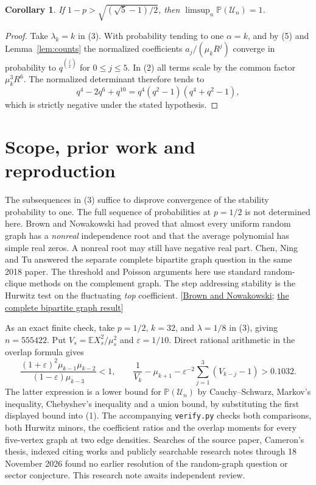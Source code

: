 \documentclass[11pt]{article}
\newtheorem{corollary}[theorem]{Corollary}
\newcommand{\E}{\mathbb E}
\newcommand{\Prob}{\mathbb P}
\newcommand{\Unst}{\mathcal U}
\begin{document}
\begin{corollary}\label{cor:whp}
If $1-p>\sqrt{(\sqrt5-1)/2}$, then $\limsup_n\Prob(\Unst_n)=1$.
\end{corollary}
\begin{proof}
Take $\lambda_k=k$ in (3). With probability tending to one $\alpha=k$,
and by (5) and Lemma~\ref{lem:counts} the normalized coefficients
$a_j/(\mu_k R^j)$ converge in probability to $q^{\binom j2}$ for
$0\le j\le5$. In (2) all terms scale by the common factor
$\mu_k^3 R^6$. The normalized determinant therefore tends to
\[
 q^4-2q^6+q^{10}=q^4(q^2-1)(q^4+q^2-1),
\]
which is strictly negative under the stated hypothesis.
\end{proof}

\section*{Scope, prior work and reproduction}
The subsequences in (3) suffice to disprove convergence of the stability
probability to one. The full sequence of probabilities at $p=1/2$ is
not determined here. Brown and Nowakowski had proved that almost every
uniform random graph has a \emph{nonreal} independence root and that the
average polynomial has simple real zeros. A nonreal root may still have
negative real part. Chen, Ning and Tu answered the separate complete
bipartite graph question in the same 2018 paper. The threshold and
Poisson arguments here use standard random-clique methods on the
complement graph. The step addressing stability is the Hurwitz test on
the fluctuating \emph{top} coefficient.
[\href{https://doi.org/10.1016/j.jctb.2004.10.001}{Brown and Nowakowski};
\href{https://arxiv.org/abs/2505.24381}{the complete bipartite graph result}]

As an exact finite check, take $p=1/2$, $k=32$, and $\lambda=1/8$
in (3), giving $n=555422$. Put $V_s=\E X_s^2/\mu_s^2$ and
$\varepsilon=1/10$. Direct rational arithmetic in the overlap formula gives
\[
 \frac{(1+\varepsilon)^2\mu_{k-1}\mu_{k-2}}
      {(1-\varepsilon)\mu_{k-3}}<1,\qquad
 \frac1{V_k}-\mu_{k+1}
   -\varepsilon^{-2}\sum_{j=1}^3(V_{k-j}-1)>0.1032 .
\]
The latter expression is a lower bound for $\Prob(\Unst_n)$ by
Cauchy--Schwarz, Markov's inequality, Chebyshev's inequality and a
union bound, by substituting the first displayed bound into (1). The accompanying
\texttt{verify.py} checks both comparisons, both Hurwitz minors, the
coefficient ratios and the overlap moments for every five-vertex graph
at two edge densities. Searches of the source paper,
Cameron's thesis, indexed citing works and publicly searchable research
notes through 18 November 2026 found no earlier resolution of the
random-graph question or sector conjecture. This research note awaits
independent review.
\end{document}
